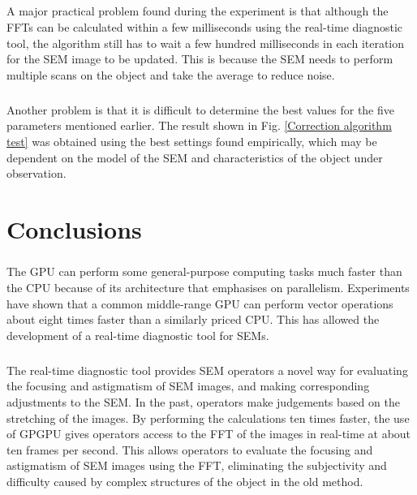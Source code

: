 \documentclass[12pt, twocolumn]{report}
\begin{document}
\paragraph{}
A major practical problem found during the experiment is that although the FFTs can be calculated within a few milliseconds using the real-time diagnostic tool, the algorithm still has to wait a few hundred milliseconds in each iteration for the SEM image to be updated. This is because the SEM needs to perform multiple scans on the object and take the average to reduce noise.

\paragraph{}
Another problem is that it is difficult to determine the best values for the five parameters mentioned earlier. The result shown in Fig. \ref{Correction algorithm test} was obtained using the best settings found empirically, which may be dependent on the model of the SEM and characteristics of the object under observation.

\chapter{Conclusions}
\paragraph{}
The GPU can perform some general-purpose computing tasks much faster than the CPU because of its architecture that emphasises on parallelism. Experiments have shown that a common middle-range GPU can perform vector operations about eight times faster than a similarly priced CPU. This has allowed the development of a real-time diagnostic tool for SEMs.

\paragraph{}
The real-time diagnostic tool provides SEM operators a novel way for evaluating the focusing and astigmatism of SEM images, and making corresponding adjustments to the SEM. In the past, operators make judgements based on the stretching of the images. By performing the calculations ten times faster, the use of GPGPU gives operators access to the FFT of the images in real-time at about ten frames per second. This allows operators to evaluate the focusing and astigmatism of SEM images using the FFT, eliminating the subjectivity and difficulty caused by complex structures of the object in the old method.
\end{document}
